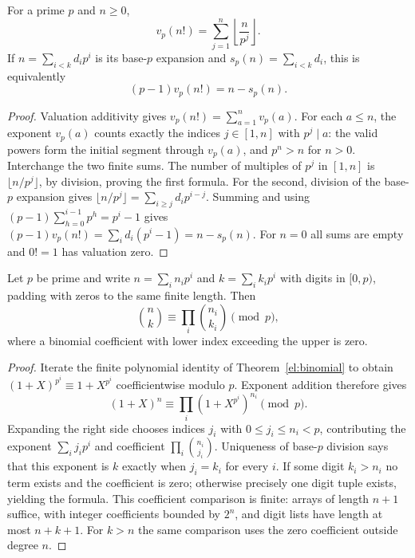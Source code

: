 \begin{theorem}
\label{el:legendre}
For a prime $p$ and $n\ge0$,
\[
        v_p(n!)=\sum_{j=1}^{n}\left\lfloor\frac{n}{p^j}\right\rfloor.
\]
If $n=\sum_{i<k}d_i p^i$ is its base-$p$ expansion and
$s_p(n)=\sum_{i<k}d_i$, this is equivalently
\[
                 (p-1)v_p(n!)=n-s_p(n).
\]
\end{theorem}
\begin{proof}
Valuation additivity gives $v_p(n!)=\sum_{a=1}^n v_p(a)$.
For each $a\le n$, the exponent $v_p(a)$ counts exactly the indices
$j\in[1,n]$ with $p^j\mid a$: the valid powers form the initial segment
through $v_p(a)$, and $p^n>n$ for $n>0$.  Interchange the two finite
sums.  The number of multiples of $p^j$ in $[1,n]$ is
$\lfloor n/p^j\rfloor$, by division, proving the first formula.
For the second, division of the base-$p$ expansion gives
$\lfloor n/p^j\rfloor=\sum_{i\ge j}d_i p^{i-j}$.
Summing and using
$(p-1)\sum_{h=0}^{i-1}p^h=p^i-1$ gives
$(p-1)v_p(n!)=\sum_i d_i(p^i-1)=n-s_p(n)$.
For $n=0$ all sums are empty and $0!=1$ has valuation zero.
\end{proof}

\begin{theorem}\label{el:lucas}
Let $p$ be prime and write $n=\sum_i n_i p^i$ and
$k=\sum_i k_i p^i$ with digits in $[0,p)$, padding with zeros to the
same finite length.  Then
\[
                    \binom nk\equiv\prod_i\binom{n_i}{k_i}\pmod p,
\]
where a binomial coefficient with lower index exceeding the upper
is zero.
\end{theorem}
\begin{proof}
Iterate the finite polynomial identity of
Theorem~\ref{el:binomial} to obtain
$(1+X)^{p^i}\equiv1+X^{p^i}$ coefficientwise modulo $p$.
Exponent addition therefore gives
\[
 (1+X)^n\equiv\prod_i(1+X^{p^i})^{n_i}\pmod p.
\]
Expanding the right side chooses indices $j_i$ with
$0\le j_i\le n_i<p$, contributing the exponent
$\sum_i j_i p^i$ and coefficient $\prod_i\binom{n_i}{j_i}$.
Uniqueness of base-$p$ division says that this exponent is $k$ exactly
when $j_i=k_i$ for every $i$.  If some digit $k_i>n_i$ no term exists
and the coefficient is zero; otherwise precisely one digit tuple
exists, yielding the formula.  This coefficient comparison is finite:
arrays of length $n+1$ suffice, with integer coefficients bounded by
$2^n$, and digit lists have length at most $n+k+1$.  For $k>n$ the
same comparison uses the zero coefficient outside degree $n$.
\end{proof}

